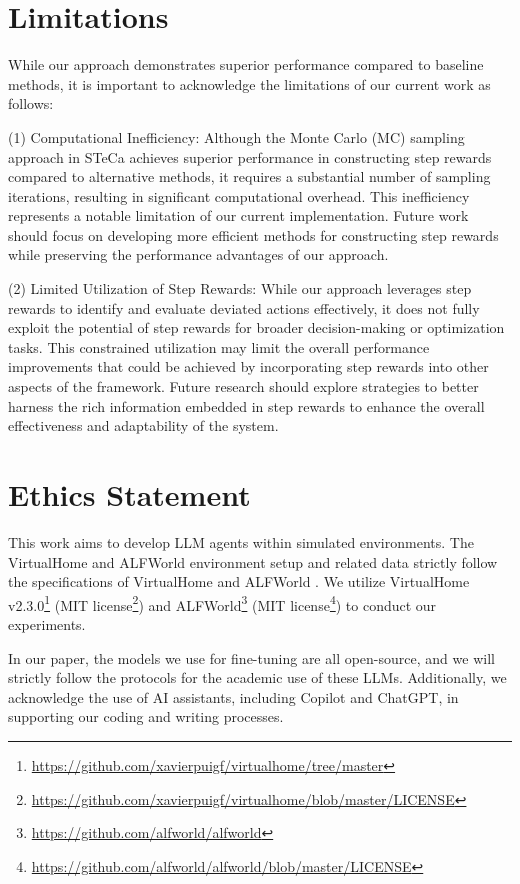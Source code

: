 \section*{Limitations}

While our approach demonstrates superior performance compared to baseline methods, it is important to acknowledge the limitations of our current work as follows:

(1) Computational Inefficiency: Although the Monte Carlo (MC) sampling approach in STeCa achieves superior performance in constructing step rewards compared to alternative methods, it requires a substantial number of sampling iterations, resulting in significant computational overhead. This inefficiency represents a notable limitation of our current implementation. Future work should focus on developing more efficient methods for constructing step rewards while preserving the performance advantages of our approach.

(2) Limited Utilization of Step Rewards: While our approach leverages step rewards to identify and evaluate deviated actions effectively, it does not fully exploit the potential of step rewards for broader decision-making or optimization tasks. This constrained utilization may limit the overall performance improvements that could be achieved by incorporating step rewards into other aspects of the framework. Future research should explore strategies to better harness the rich information embedded in step rewards to enhance the overall effectiveness and adaptability of the system.


\section*{Ethics Statement}

This work aims to develop LLM agents within simulated environments. The VirtualHome and ALFWorld environment setup and related data strictly follow the specifications of VirtualHome \citep{puig2018virtualhome} and ALFWorld \citep{shridhar2020alfworld}. We utilize VirtualHome v2.3.0\footnote{\url{https://github.com/xavierpuigf/virtualhome/tree/master}} (MIT license\footnote{\url{https://github.com/xavierpuigf/virtualhome/blob/master/LICENSE}}) and ALFWorld\footnote{\url{https://github.com/alfworld/alfworld}} (MIT license\footnote{\url{https://github.com/alfworld/alfworld/blob/master/LICENSE}}) to conduct our experiments. 

In our paper, the models we use for fine-tuning are all open-source, and we will strictly follow the protocols for the academic use of these LLMs.
Additionally, we acknowledge the use of AI assistants, including Copilot and ChatGPT, in supporting our coding and writing processes.